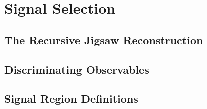 \section{Signal Selection}
\label{sec:stop_strategy}

\subsection{The Recursive Jigsaw Reconstruction}
\label{sec:stop_rjr}

\subsection{Discriminating Observables}
\label{sec:stop_variables}

\subsection{Signal Region Definitions}
\label{sec:stop_signal_region}
